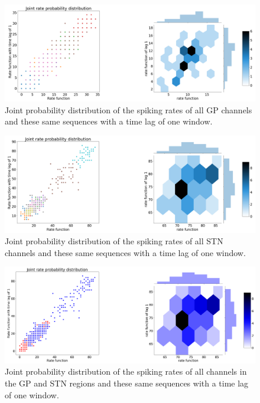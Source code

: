 \documentclass{kththesis}
\begin{document}
\begin{figure}[H]
    \centering
    \centerline{\includegraphics[width=1.1\textwidth]{images/spiking/JP_gp.png}}
    \caption{Joint probability distribution of the spiking rates of all GP channels and these same sequences with a time lag of one window. }
    \label{fig:JP1}
\end{figure}

\begin{figure}[H]
    \centering
    \centerline{\includegraphics[width=1.1\textwidth]{images/spiking/JP_stn.png}}
    \caption{Joint probability distribution of the spiking rates of all STN channels and these same sequences with a time lag of one window.}
    \label{fig:JP2}
\end{figure}

\begin{figure}[H]
    \centering
    \centerline{\includegraphics[width=1.1\textwidth]{images/spiking/JP_all.png}}
    \caption{Joint probability distribution of the spiking rates of all channels in the GP and STN regions and these same sequences with a time lag of one window.}
    \label{fig:JP3}
\end{figure}
\end{document}
